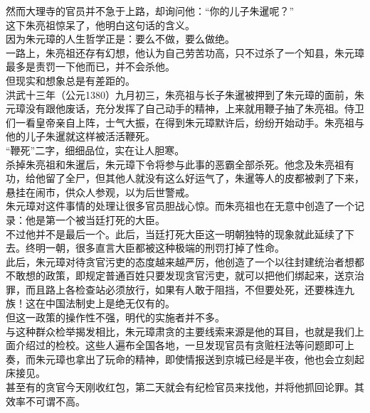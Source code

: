 \begin{multicols}{\theparacolNo}
然而大理寺的官员并不急于上路，却询问他：“你的儿子朱暹呢？”\\

这下朱亮祖惊呆了，他明白这句话的含义。\\

因为朱元璋的人生哲学正是：要么不做，要么做绝。\\

一路上，朱亮祖还存有幻想，他认为自己劳苦功高，只不过杀了一个知县，朱元璋最多是责罚一下他而已，并不会杀他。\\

但现实和想象总是有差距的。\\

洪武十三年（公元1380）九月初三，朱亮祖与长子朱暹被押到了朱元璋的面前，朱元璋没有跟他废话，充分发挥了自己动手的精神，上来就用鞭子抽了朱亮祖。侍卫们一看皇帝亲自上阵，士气大振，在得到朱元璋默许后，纷纷开始动手。朱亮祖与他的儿子朱暹就这样被活活鞭死。\\

“鞭死”二字，细细品位，实在让人胆寒。\\

杀掉朱亮祖和朱暹后，朱元璋下令将参与此事的恶霸全部杀死。他念及朱亮祖有功，给他留了全尸，但其他人就没有这么好运气了，朱暹等人的皮都被剥了下来，悬挂在闹市，供众人参观，以为后世警戒。\\

朱元璋对这件事情的处理让很多官员胆战心惊。而朱亮祖也在无意中创造了一个记录：他是第一个被当廷打死的大臣。\\

不过他并不是最后一个。此后，当廷打死大臣这一明朝独特的现象就此延续了下去。终明一朝，很多直言大臣都被这种极端的刑罚打掉了性命。\\

此后，朱元璋对待贪官污吏的态度越来越严厉，他创造了一个以往封建统治者想都不敢想的政策，即规定普通百姓只要发现贪官污吏，就可以把他们绑起来，送京治罪，而且路上各检查站必须放行，如果有人敢于阻挡，不但要处死，还要株连九族！这在中国法制史上是绝无仅有的。\\

但这一政策的操作性不强，明代的实施者并不多。\\

与这种群众检举揭发相比，朱元璋肃贪的主要线索来源是他的耳目，也就是我们上面介绍过的检校。这些人遍布全国各地，一旦发现官员有贪赃枉法等问题即可上奏，而朱元璋也拿出了玩命的精神，即使情报送到京城已经是半夜，他也会立刻起床接见。\\

甚至有的贪官今天刚收红包，第二天就会有纪检官员来找他，并将他抓回论罪。其效率不可谓不高。\\


\end{multicols}

